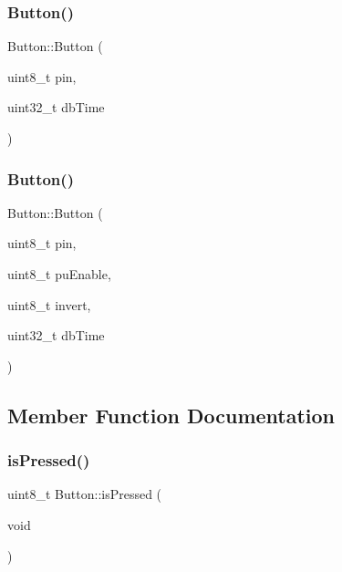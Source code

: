 \mbox{\label{class_button_ad61b19bac87236f03f72f5debce40057}} 
\subsubsection{\texorpdfstring{Button()}{Button()}\hspace{0.1cm}{\footnotesize\ttfamily [2/3]}}
{\footnotesize\ttfamily Button\+::\+Button (\begin{DoxyParamCaption}\item[{uint8\+\_\+t}]{pin,  }\item[{uint32\+\_\+t}]{db\+Time }\end{DoxyParamCaption})}

\mbox{\label{class_button_afed59e35f623f232ae04a892127a0738}} 
\subsubsection{\texorpdfstring{Button()}{Button()}\hspace{0.1cm}{\footnotesize\ttfamily [3/3]}}
{\footnotesize\ttfamily Button\+::\+Button (\begin{DoxyParamCaption}\item[{uint8\+\_\+t}]{pin,  }\item[{uint8\+\_\+t}]{pu\+Enable,  }\item[{uint8\+\_\+t}]{invert,  }\item[{uint32\+\_\+t}]{db\+Time }\end{DoxyParamCaption})}



\subsection{Member Function Documentation}
\mbox{\label{class_button_adc52c28d5eecbb08818e4a701e346fb0}} 
\subsubsection{\texorpdfstring{is\+Pressed()}{isPressed()}}
{\footnotesize\ttfamily uint8\+\_\+t Button\+::is\+Pressed (\begin{DoxyParamCaption}\item[{void}]{ }\end{DoxyParamCaption})}

